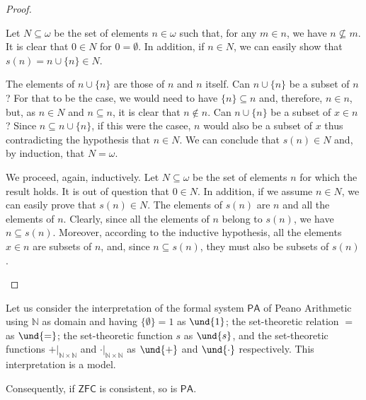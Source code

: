 \begin{proof}
\begin{parlist}
\item Let $N\subseteq \omega$ be the set of elements $n\in\omega$ such that, for any $m\in n$, we have $n\not\subseteq m$. It is clear that $0 \in N$ for $0 = \emptyset$. In addition, if $n \in N$, we can easily show that $s(n) = n \cup \{n\}\in N$.

The elements of $n \cup \{n\}$ are those of $n$ and $n$ itself. Can $n\cup\{n\}$ be a subset of $n$? For that to be the case, we would need to have $\{n\}\subseteq n$ and, therefore, $n\in n$, but, as $n\in N$ and $n\subseteq n$, it is clear that $n\not\in n$. Can $n\cup \{n\}$ be a subset of $x\in n$? Since $n\subseteq n \cup\{n\}$, if this were the casee, $n$ would also be a subset of $x$ thus contradicting the hypothesis that $n\in N$. We can conclude that $s(n) \in N$ and, by induction, that $N = \omega$.

\item We proceed, again, inductively. Let $N\subseteq\omega$ be the set of elements $n$ for which the result holds.
It is out of question that $0\in N$.
In addition, if we assume $n\in N$, we can easily prove that $s(n)\in N$.
The elements of $s(n)$ are $n$ and all the elements of $n$.
Clearly, since all the elements of $n$ belong to $s(n)$, we have $n\subseteq s(n)$.
Moreover, according to the inductive hypothesis, all the elements $x\in n$ are subsets of $n$, and, since $n \subseteq s(n)$, they must also be subsets of $s(n)$.
\end{parlist}
\end{proof}


\begin{theorem}
Let us consider the interpretation of the formal system $\mathsf{PA}$ of Peano Arithmetic using $\mathbb{N}$ as domain and having $\{\emptyset\} = 1$ as $\und{1}$; the set-theoretic relation $=$ as $\und{=}$; the set-theoretic function $s$ as $\und{s}$, and the set-theoretic functions $+\vert_{\mathbb{N}\times\mathbb{N}}$ and $\cdot\vert_{\mathbb{N}\times\mathbb{N}}$ as $\und{+}$ and $\und{\cdot}$ respectively.
This interpretation is a model.

Consequently, if $\mathsf{ZFC}$ is consistent, so is $\mathsf{PA}$.
\label{<+label+>}
\end{theorem}

